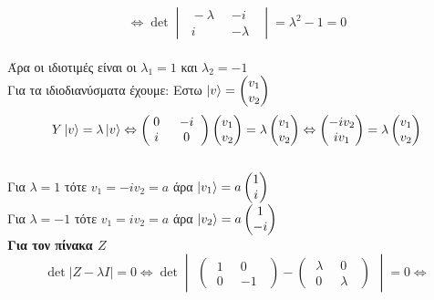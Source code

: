 \documentclass[12pt]{article}
\begin{document}
$$ \Leftrightarrow\det \begin{vmatrix}\;-\lambda \;\; & -i \;\;\\ \;i \;\; & -\lambda \;\;\end{vmatrix} = \lambda^2 -1=0 $$ \\
Άρα οι ιδιοτιμές είναι οι $\lambda_1 = 1$ και $\lambda_2=-1$ \\
Για τα ιδιοδιανύσματα έχουμε:
Εστω $\ket{v}=\begin{pmatrix} v_1 \\ v_2\end{pmatrix}$
$$Y\ket{v}=\lambda\ket{ v} \Leftrightarrow \begin{pmatrix}\;0 \;\; & -i \;\;\\ \;i \;\; & 0 \;\;\end{pmatrix}\begin{pmatrix} v_1 \\ v_2\end{pmatrix}=\lambda\begin{pmatrix} v_1 \\ v_2\end{pmatrix} \Leftrightarrow 
\begin{pmatrix} -iv_2 \\ iv_1\end{pmatrix} = \lambda \begin{pmatrix} v_1 \\ v_2\end{pmatrix}$$\\
Για $\lambda =1 $ τότε $v_1=-iv_2=a$ άρα $\ket{v_1} = a\begin{pmatrix} 1 \\ i \end{pmatrix}$\\
Για $\lambda =-1 $ τότε $v_1=iv_2=a$ άρα $\ket{v_2} = a\begin{pmatrix} 1 \\ -i \end{pmatrix}$ \\
{\bf Για τον πίνακα $Z$}\\


$$ \det |Z-\lambda I| = 0 \Leftrightarrow \det \begin{vmatrix}\begin{pmatrix}\;1 \;\; & 0 \;\;\\ \;0 \;\; & -1 \;\;\end{pmatrix} -\begin{pmatrix}\;\lambda \;\; & 0 \;\;\\\;0 \;\; & \lambda \;\;\end{pmatrix}\end{vmatrix}  =0 \Leftrightarrow$$
\end{document}
